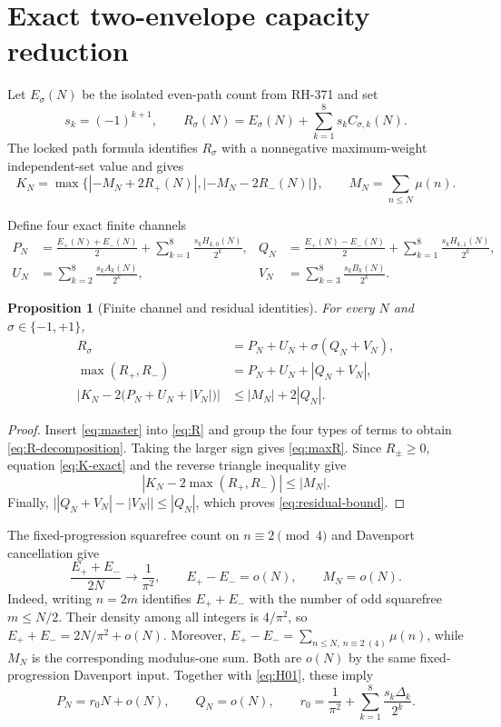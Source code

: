 \documentclass[11pt]{article}
\newtheorem{proposition}[theorem]{Proposition}
\theoremstyle{definition}
\theoremstyle{remark}
\newcommand{\Mob}{\mu}
\begin{document}
\section{Exact two-envelope capacity reduction}

Let $E_\sigma(N)$ be the isolated even-path count from RH-371 and set
\begin{equation}
 s_k=(-1)^{k+1},\qquad
 R_\sigma(N)=E_\sigma(N)+\sum_{k=1}^8s_kC_{\sigma,k}(N).
 \label{eq:R}
\end{equation}
The locked path formula identifies $R_\sigma$ with a nonnegative
maximum-weight independent-set value and gives
\begin{equation}
 K_N=\max\{|{-M_N+2R_+(N)}|,|{-M_N-2R_-(N)}|\},
 \qquad M_N=\sum_{n\le N}\Mob(n).
 \label{eq:K-exact}
\end{equation}

Define four exact finite channels
\begin{align}
 P_N&=\frac{E_+(N)+E_-(N)}2+
       \sum_{k=1}^8\frac{s_kH_{k,0}(N)}{2^k},
 &Q_N&=\frac{E_+(N)-E_-(N)}2+
       \sum_{k=1}^8\frac{s_kH_{k,1}(N)}{2^k},
 \label{eq:PQ}\\
 U_N&=\sum_{k=2}^8\frac{s_kA_k(N)}{2^k},
 &V_N&=\sum_{k=3}^8\frac{s_kB_k(N)}{2^k}.
 \label{eq:UV}
\end{align}

\begin{proposition}[Finite channel and residual identities]
For every $N$ and $\sigma\in\{-1,+1\}$,
\begin{align}
 R_\sigma&=P_N+U_N+\sigma(Q_N+V_N),
 \label{eq:R-decomposition}\\
 \max(R_+,R_-)&=P_N+U_N+|Q_N+V_N|,
 \label{eq:maxR}\\
 \left|K_N-2\bigl(P_N+U_N+|V_N|\bigr)\right|
 &\le |M_N|+2|Q_N|.
 \label{eq:residual-bound}
\end{align}
\end{proposition}

\begin{proof}
Insert \eqref{eq:master} into \eqref{eq:R} and group the four types of
terms to obtain \eqref{eq:R-decomposition}.  Taking the larger sign gives
\eqref{eq:maxR}.  Since $R_\pm\ge0$, equation \eqref{eq:K-exact} and the
reverse triangle inequality give
\[
 |K_N-2\max(R_+,R_-)|\le|M_N|.
\]
Finally,
$\bigl||Q_N+V_N|-|V_N|\bigr|\le|Q_N|$, which proves
\eqref{eq:residual-bound}.
\end{proof}

The fixed-progression squarefree count on $n\equiv2\pmod4$ and Davenport
cancellation give
\[
 \frac{E_++E_-}{2N}\longrightarrow\frac1{\pi^2},
 \qquad E_+-E_-=o(N),\qquad M_N=o(N).
\]
Indeed, writing $n=2m$ identifies $E_++E_-$ with the number of odd
squarefree $m\le N/2$.  Their density among all integers is $4/\pi^2$, so
$E_++E_-=2N/\pi^2+o(N)$.  Moreover,
$E_+-E_-=\sum_{n\le N,\ n\equiv2\ (4)}\Mob(n)$, while $M_N$ is the
corresponding modulus-one sum.  Both are $o(N)$ by the same fixed-progression
Davenport input.
Together with \eqref{eq:H01}, these imply
\begin{equation}
 P_N=r_0N+o(N),\qquad Q_N=o(N),\qquad
 r_0=\frac1{\pi^2}+\sum_{k=1}^8\frac{s_k\Delta_k}{2^k}.
 \label{eq:r0}
\end{equation}
\end{document}

